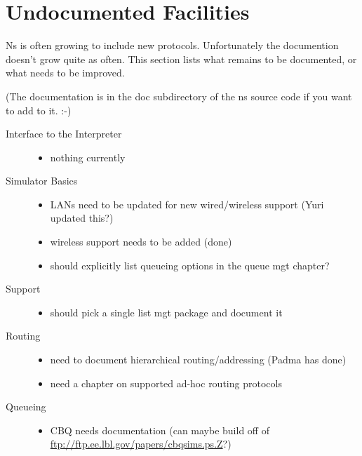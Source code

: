 
\chapter{Undocumented Facilities}

Ns is often growing to include new protocols.
Unfortunately the documention doesn't grow quite as often.
This section lists what remains to be documented,
  or what needs to be improved.

(The documentation is in the doc subdirectory of the ns source code
  if you want to add to it. :-)

\begin{description}
\item[Interface to the Interpreter]

	\begin{itemize}
	\item nothing currently
	\end{itemize}

\item[Simulator Basics]

	\begin{itemize}
	\item LANs need to be updated for new wired/wireless support
		(Yuri updated this?)
	\item wireless support needs to be added
		(done)
	\item should explicitly list queueing options in the queue mgt chapter?
	\end{itemize}

\item[Support]

	\begin{itemize}
	\item should pick a single list mgt package and document it
	\end{itemize}

\item[Routing]

	\begin{itemize}
	\item need to document hierarchical routing/addressing
		(Padma has done)
	\item need a chapter on supported ad-hoc routing protocols
	\end{itemize}

\item[Queueing]

	\begin{itemize}
	\item CBQ needs documentation (can maybe build off of 
		\url{ftp://ftp.ee.lbl.gov/papers/cbqsims.ps.Z}?)
	\end{itemize}


\end{description}
